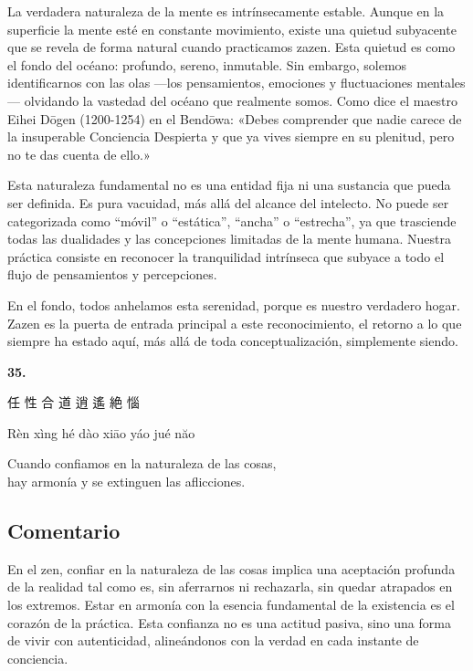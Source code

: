 \documentclass[
  a5paperpaper,
]{article}
\begin{document}
La verdadera naturaleza de la mente es intrínsecamente estable. Aunque
en la superficie la mente esté en constante movimiento, existe una
quietud subyacente que se revela de forma natural cuando practicamos
zazen. Esta quietud es como el fondo del océano: profundo, sereno,
inmutable. Sin embargo, solemos identificarnos con las olas ---los
pensamientos, emociones y fluctuaciones mentales--- olvidando la
vastedad del océano que realmente somos. Como dice el maestro Eihei
Dōgen (1200-1254) en el Bendōwa: «Debes comprender que nadie carece de
la insuperable Conciencia Despierta y que ya vives siempre en su
plenitud, pero no te das cuenta de ello.»

Esta naturaleza fundamental no es una entidad fija ni una sustancia que
pueda ser definida. Es pura vacuidad, más allá del alcance del
intelecto. No puede ser categorizada como ``móvil'' o ``estática'',
``ancha'' o ``estrecha'', ya que trasciende todas las dualidades y las
concepciones limitadas de la mente humana. Nuestra práctica consiste en
reconocer la tranquilidad intrínseca que subyace a todo el flujo de
pensamientos y percepciones.

En el fondo, todos anhelamos esta serenidad, porque es nuestro verdadero
hogar. Zazen es la puerta de entrada principal a este reconocimiento, el
retorno a lo que siempre ha estado aquí, más allá de toda
conceptualización, simplemente siendo.

\hfill\break

\hypertarget{05}{}
\begin{verseblock}

\newpage

\begin{center}\textbf{35.}\end{center}

任 性 合 道 逍 遙 絶 惱

Rèn xìng hé dào xiāo yáo jué năo

Cuando confiamos en la naturaleza de las cosas,\\
hay armonía y se extinguen las aflicciones.

\end{verseblock}

\hfill\break

\hypertarget{comentario-34}{%
\subsection{Comentario}\label{comentario-34}}

En el zen, confiar en la naturaleza de las cosas implica una aceptación
profunda de la realidad tal como es, sin aferrarnos ni rechazarla, sin
quedar atrapados en los extremos. Estar en armonía con la esencia
fundamental de la existencia es el corazón de la práctica. Esta
confianza no es una actitud pasiva, sino una forma de vivir con
autenticidad, alineándonos con la verdad en cada instante de conciencia.
\end{document}
